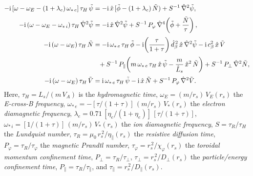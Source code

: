 \documentclass[notitlepage,12pt]{article}
\begin{document}
\begin{align}\label{e301}
-{\rm i}\,[\omega-\omega_E -(1+\lambda_e)\,\omega_{\ast\,e}]\,\tau_H\,\tilde{\psi} &= -{\rm i} \,\hat{x}\,[\tilde{\phi}-(1+\lambda_e)\,\tilde{N}) + S^{-1}\,\hat{\nabla}^2\tilde{\psi},\\[0.5ex]
-{\rm i}\,(\omega-\omega_E-\omega_{\ast\,i})\,\tau_H\,\hat{\nabla}^2\tilde{\psi} &= -{\rm i}\,\hat{x}\,\hat{\nabla}^2\tilde{\psi}+S^{-1}\,P_\varphi\,\hat{\nabla}^4\!\left(\tilde{\phi} + \frac{\tilde{N}}{\tau}\right),\\[0.5ex]
-{\rm i}\,(\omega-\omega_E)\,\tau_H\,\tilde{N} &= -{\rm i}\,\omega_{\ast\,e}\,\tau_H\,\tilde{\phi} - {\rm i}\!\left(\frac{\tau}{1+\tau}\right)\hat{d}_\beta^{\,2}\,\hat{x}\,\hat{\nabla}^2\tilde{\psi} -{\rm i}\,c_\beta^2\,\hat{x}\,\tilde{V}\\[0.5ex]
&\phantom{=}
+S^{-1}\,P_\parallel\!\left(m\,\omega_{\ast\,e}\,\tau_H\,\hat{x}\,\tilde{\psi}-\frac{m}{\hat{L}_s}\,\hat{x}^2\,\tilde{N}\right)
+ S^{-1}\,P_\perp\,\hat{\nabla}^2 \tilde{N},\nonumber\\[0.5ex]
-{\rm i}\,(\omega-\omega_E)\,\tau_H\,\tilde{V} &= {\rm i}\,\omega_{\ast\,e}\,\tau_H\,\tilde{\psi} - {\rm i}\,\hat{x}\,\tilde{N}
+ S^{-1}\,P_\varphi\,\hat{\nabla}^2\tilde{V}.\label{e304}
\end{align}
Here, $\tau_H = L_s/(m\,V_A)$ is the {\em hydromagnetic time}, $\omega_E = (m/r_s)\,V_E(r_s)$  the 
{\em E-cross-B frequency}, $\omega_{\ast\,e} = -[\tau/(1+\tau)]\,(m/r_s)\,V_\ast(r_s)$  the {\em electron diamagnetic
frequency}, $\lambda_e = 0.71\,[\eta_e/(1+\eta_e)]\,[\tau/(1+\tau)]$, $\omega_{\ast\,i} = [1/(1+\tau)]\,(m/r_s)\,V_\ast(r_s)$  the {\em ion diamagnetic
frequency}, $S=\tau_R/\tau_H$ the {\em Lundquist number}, $\tau_R = \mu_0\,r_s^{\,2}/\eta_\parallel(r_s)$  the
{\em resistive diffusion time}, $P_\varphi = \tau_R/\tau_\varphi$ the {\em magnetic Prandtl number}, $\tau_\varphi
= r_s^{\,2}/\chi_\varphi(r_s)$  the {\em toroidal momentum confinement time}, $P_\perp = \tau_R/\tau_\perp$, 
$\tau_\perp = r_s^{\,2}/D_\perp(r_s)$  the {\em particle/energy confinement time}, 
$P_\parallel=\tau_R/\tau_\parallel$, and $\tau_\parallel =r_s^{\,2}/D_\parallel(r_s)$. 
\end{document}
